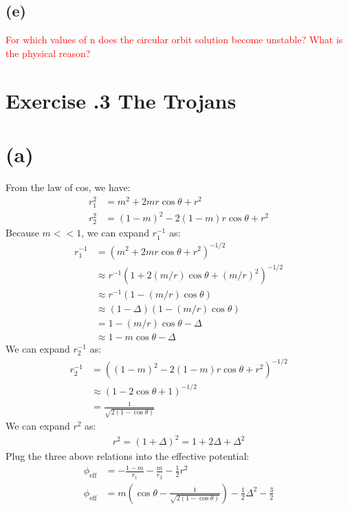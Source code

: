 \documentclass[a4paper,12pt]{article}
\begin{document}
\subsection*{(e)}
\textcolor{red}{For which values of n does the circular orbit solution become unstable? What is the physical
reason?}

\section*{\textbf{Exercise \uppercase\expandafter{}.3 The Trojans}}
\section*{(a)}
From the law of cos, we have:
\begin{align*}
    r_1^2 &= m^2 + 2mr\cos \theta + r^2 \\
    r_2^2 &= (1-m)^2 - 2(1-m)r \cos \theta + r^2
\end{align*}
Because $m<<1$, we can expand $r_1^{-1}$ as:
\begin{align*}
    r_1^{-1} &= (m^2 + 2mr\cos \theta + r^2)^{-1/2} \\
            &\approx r^{-1} (1 + 2(m/r) \cos \theta + (m/r)^2)^{-1/2} \\
            &\approx r^{-1} (1 - (m/r) \cos \theta) \\
            &\approx (1-\Delta) (1 - (m/r) \cos \theta) \\
            &= 1 - (m/r) \cos \theta - \Delta \\
            &\approx 1 - m \cos \theta - \Delta
\end{align*}
We can expand $r_2^{-1}$ as:
\begin{align*}
    r_2^{-1} &= ((1-m)^2 - 2(1-m)r \cos \theta + r^2)^{-1/2} \\
            &\approx (1 - 2 \cos \theta + 1)^{-1/2} \\
            &= \frac{1}{\sqrt{2(1- \cos \theta)}}
\end{align*}
We can expand $r^2$ as:
\begin{align*}
    r^2 = (1+\Delta)^2 = 1 + 2\Delta + \Delta^2
\end{align*}
Plug the three above relations into the effective potential:
\begin{align*}
    \phi_{\text{eff}} &= -\frac{1-m}{r_1} - \frac{m}{r_2} - \frac{1}{2}r^2 \\
    \phi_{\text{eff}} &= m(\cos \theta - \frac{1}{\sqrt{2(1- \cos \theta)}}) - \frac{1}{2}\Delta^2 - \frac{3}{2}
\end{align*}
\end{document}

